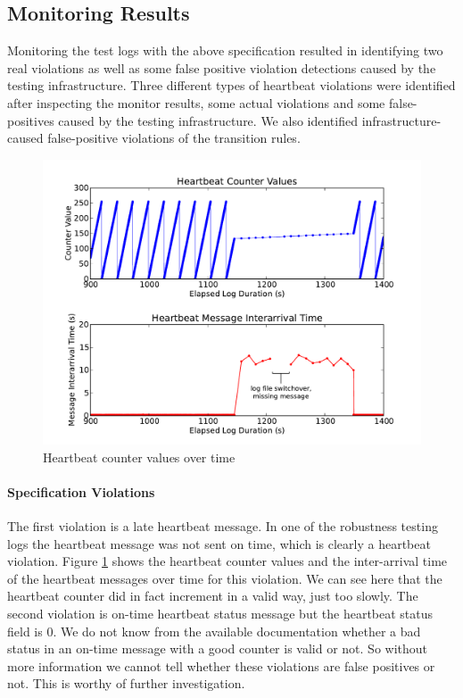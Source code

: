 
\subsection{Monitoring Results}
Monitoring the test logs with the above specification resulted in identifying two real violations as well as some false positive violation detections caused by the testing infrastructure.
%
Three different types of heartbeat violations were identified after inspecting the monitor results, some actual violations and some false-positives caused by the testing infrastructure. We also identified infrastructure-caused false-positive violations of the transition rules.

\begin{figure}
		\includegraphics[width=4.5in]{img/hb1}
		\caption{Heartbeat counter values over time}
		\label{fig:hb_arrival}
\end{figure}

\paragraph{Specification Violations}
The first violation is a late heartbeat message. In one of the robustness testing logs the heartbeat message was not sent on time, which is clearly a heartbeat violation. Figure \ref{fig:hb_arrival} shows the heartbeat counter values and the inter-arrival time of the heartbeat messages over time for this violation. We can see here that the heartbeat counter did in fact increment in a valid way, just too slowly. 
The second violation is on-time heartbeat status message but the heartbeat status field is 0. 
We do not know from the available documentation whether a bad status in an on-time message with a good counter is valid or not. So without more information we cannot tell whether these violations are false positives or not. This is worthy of further investigation.


